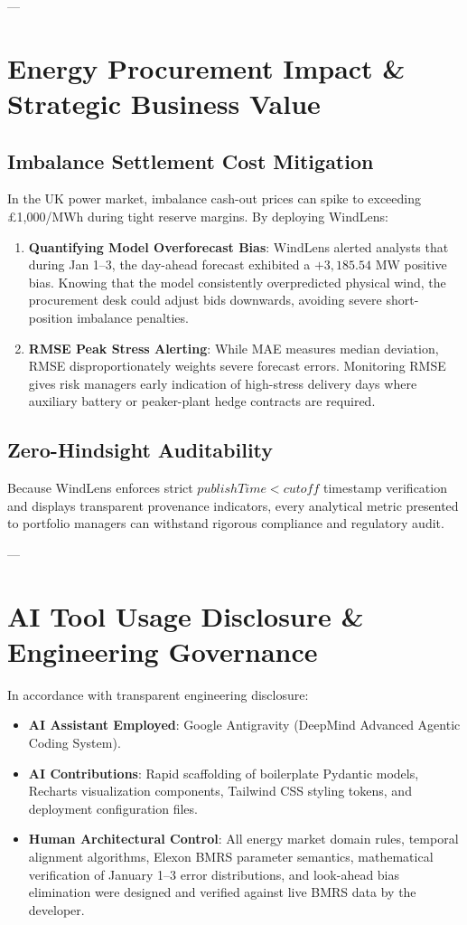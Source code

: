 \documentclass[11pt,a4paper]{article}
\begin{document}
---

\section{Energy Procurement Impact \& Strategic Business Value}

\subsection{Imbalance Settlement Cost Mitigation}
In the UK power market, imbalance cash-out prices can spike to exceeding \pounds 1,000/MWh during tight reserve margins. By deploying WindLens:
\begin{enumerate}
    \item \textbf{Quantifying Model Overforecast Bias}: WindLens alerted analysts that during Jan 1--3, the day-ahead forecast exhibited a $+3,185.54$ MW positive bias. Knowing that the model consistently overpredicted physical wind, the procurement desk could adjust bids downwards, avoiding severe short-position imbalance penalties.
    \item \textbf{RMSE Peak Stress Alerting}: While MAE measures median deviation, RMSE disproportionately weights severe forecast errors. Monitoring RMSE gives risk managers early indication of high-stress delivery days where auxiliary battery or peaker-plant hedge contracts are required.
\end{enumerate}

\subsection{Zero-Hindsight Auditability}
Because WindLens enforces strict $publishTime < cutoff$ timestamp verification and displays transparent provenance indicators, every analytical metric presented to portfolio managers can withstand rigorous compliance and regulatory audit.

---

\section{AI Tool Usage Disclosure \& Engineering Governance}

In accordance with transparent engineering disclosure:
\begin{itemize}[leftmargin=*]
    \item \textbf{AI Assistant Employed}: Google Antigravity (DeepMind Advanced Agentic Coding System).
    \item \textbf{AI Contributions}: Rapid scaffolding of boilerplate Pydantic models, Recharts visualization components, Tailwind CSS styling tokens, and deployment configuration files.
    \item \textbf{Human Architectural Control}: All energy market domain rules, temporal alignment algorithms, Elexon BMRS parameter semantics, mathematical verification of January 1--3 error distributions, and look-ahead bias elimination were designed and verified against live BMRS data by the developer.
\end{itemize}
\end{document}
